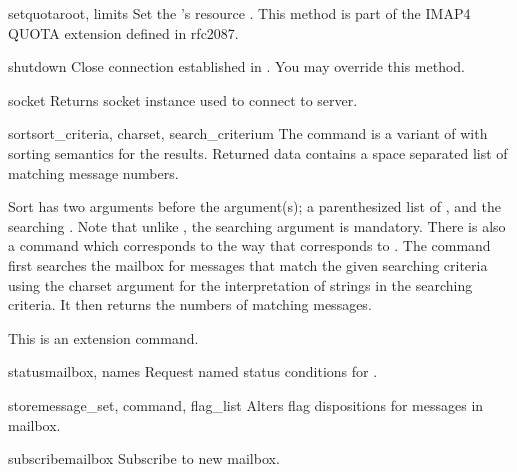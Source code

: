 \begin{methoddesc}{setquota}{root, limits}
  Set the  's resource .
  This method is part of the IMAP4 QUOTA extension defined in rfc2087.
\end{methoddesc}

\begin{methoddesc}{shutdown}{}
  Close connection established in .
  You may override this method.
\end{methoddesc}

\begin{methoddesc}{socket}{}
  Returns socket instance used to connect to server.
\end{methoddesc}

\begin{methoddesc}{sort}{sort_criteria, charset, search_criterium}
  The  command is a variant of  with sorting semantics for
  the results.  Returned data contains a space
  separated list of matching message numbers.

  Sort has two arguments before the 
  argument(s); a parenthesized list of , and the searching .
  Note that unlike , the searching  argument is mandatory.
  There is also a  command which corresponds to  the way
  that  corresponds to .
  The  command first searches the mailbox for messages that
  match the given searching criteria using the charset argument for
  the interpretation of strings in the searching criteria.  It then
  returns the numbers of matching messages.

  This is an  extension command.
\end{methoddesc}

\begin{methoddesc}{status}{mailbox, names}
  Request named status conditions for . 
\end{methoddesc}

\begin{methoddesc}{store}{message_set, command, flag_list}
  Alters flag dispositions for messages in mailbox.
\end{methoddesc}

\begin{methoddesc}{subscribe}{mailbox}
  Subscribe to new mailbox.
\end{methoddesc}

